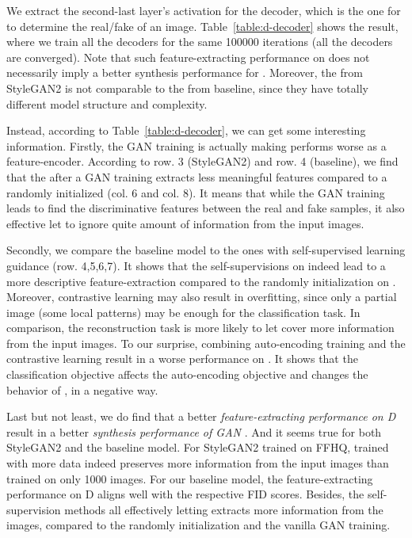 \documentclass{article} \usepackage{iclr2021_conference,times}
\begin{document}
We extract the second-last layer's activation for the decoder, which is the one for  to determine the real/fake of an image. Table~\ref{table:d-decoder} shows the result, where we train all the decoders for the same 100000 iterations (all the decoders are converged). Note that such feature-extracting performance on  does not necessarily imply a better synthesis performance for . Moreover, the  from StyleGAN2 is not comparable to the  from baseline, since they have totally different model structure and complexity. 

Instead, according to Table~\ref{table:d-decoder}, we can get some interesting information. Firstly, the GAN training is actually making  performs worse as a feature-encoder. According to row. 3 (StyleGAN2) and row. 4
(baseline), we find that the  after a GAN training extracts less meaningful features compared to a randomly initialized  (col. 6 and col. 8). It means that while the GAN training leads  to find the discriminative features between the real and fake samples, it also effective let  to ignore quite amount of information from the input images.

Secondly, we compare the baseline model to the ones with self-supervised learning guidance (row. 4,5,6,7). It shows that the self-supervisions on  indeed lead to a more descriptive feature-extraction compared to the randomly initialization on . Moreover, contrastive learning may also result in overfitting, since only a partial image (some local patterns) may be enough for the classification task. In comparison, the reconstruction task is more likely to let  cover more information from the input images. To our surprise, combining auto-encoding training and the contrastive learning result in a worse performance on . It shows that the classification objective affects the auto-encoding objective and changes the behavior of , in a negative way. 

Last but not least, we do find that a better \textit{ feature-extracting performance on D} result in a better \textit{ synthesis performance of GAN }. And it seems true for both StyleGAN2 and the baseline model. For StyleGAN2 trained on FFHQ,  trained with more data indeed preserves more information from the input images than  trained on only 1000 images. For our baseline model, the feature-extracting performance on D aligns well with the respective FID scores. Besides, the self-supervision methods all effectively letting  extracts more information from the images, compared to the randomly initialization and the vanilla GAN training.
\end{document}
